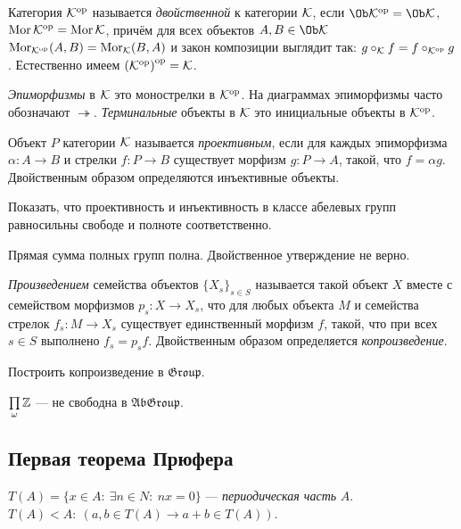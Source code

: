 \documentclass[10pt,a4paper]{article}
\begin{document}
Категория ${\mathcal{K}}^{\mathrm{op}}$ называется {\em
двойственной} к категории $\mathcal{K}$,
если $\Ob\op{\Ck}=\Ob\Ck$, $\operatorname{Mor}{\mathcal{K}}^{\mathrm{op}}=\operatorname{Mor}\mathcal{K}$, причём для всех
объектов $A,B\in\Ob\Ck$ $\operatorname{Mor}_{{\mathcal{K}}^{\mathrm{op}}}(A,B)=\operatorname{Mor}_{\mathcal{K}}(B,A)$ и
закон композиции выглядит так: $g\circ_{\mathcal{K}}f=f\circ_{{\mathcal{K}}^{\mathrm{op}}}g$.
Естественно имеем ${({\mathcal{K}}^{\mathrm{op}})}^{\mathrm{op}}=\mathcal{K}$.

{\em Эпиморфизмы} в $\mathcal{K}$ это монострелки в
${\mathcal{K}}^{\mathrm{op}}$. На диаграммах эпиморфизмы часто обозначают
$\twoheadrightarrow$. {\em
Терминальные} объекты в $\mathcal{K}$ это
инициальные объекты в ${\mathcal{K}}^{\mathrm{op}}$.

Объект $P$ категории $\mathcal{K}$ называется {\em
проективным}, если для каждых
эпиморфизма $\alpha:A\to B$ и стрелки $f:P\to B$ существует
морфизм $g:P\to A$, такой, что $f=\alpha g$. Двойственным образом
определяются инъективные объекты.

\begin{problem} Показать, что проективность и инъективность в классе
абелевых групп равносильны свободе и полноте соответственно.
\end{problem}

Прямая сумма полных групп полна. Двойственное утверждение не
верно.

\vskip-12pt  \hangindent=-30mm 
{\em Произведением} семейства
объектов $\{X_s\}_{s\in S}$ называется такой объект $X$ вместе с
семейством морфизмов $p_s:X\to X_s$, что для любых объекта $M$ и
семейства стрелок $f_s:M\to X_s$ существует единственный морфизм
$f$, такой, что при всех $s\in S$ выполнено $f_s=p_sf$.
Двойственным образом определяется {\em
копроизведение}.

\begin{problem}
Построить копроизведение в $\mathfrak{Group}$.
\end{problem}

\begin{problem} $\prod\limits_\omega \mathbb Z$ --- не свободна в
$\mathfrak{AbGroup}$.
\end{problem}

\subsection{Первая теорема Прюфера}

$T(A)=\{x\in A:~\exists n\in N:~nx=0\}$ --- {\em периодическая
часть} $A$. $T(A)<A:~(a,b\in
T(A)\rightarrow a+b\in T(A))$.
\end{document}
